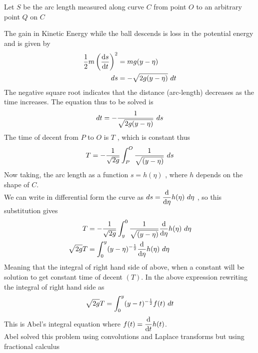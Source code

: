 Let $S$ be the arc length measured along curve $C$ from point $O$ to an arbitrary point $Q$ on $C$
\begin{center}
\end{center}
The gain in Kinetic Energy while the ball descends is loss in the
potential energy and is given by
\begin{align*}
    \frac{1}{2}m \left(\dv{s}{t}\right)^2 &= mg(y-\eta)
    \\
    ds &= - \sqrt{2g (y-\eta)} \,\, dt
\end{align*}
The negative square root indicates that the distance (arc-length) decreases as the
time increases.
The equation thus to be solved is
\[
    dt = -\frac{1}{\sqrt{2g (y-\eta)}} \,\, ds
\]
The time of decent from $P$ to $O$ is $T$ , which is constant thus
\[
    T = -\frac{1}{\sqrt{2g}} \int_{P}^{O}\frac{1}{\sqrt{(y-\eta)}} \,\, ds
\]
Now taking, the arc length as a function $s = h(\eta)$ , where $h$ depends on the shape
of $C$. \\
We can write in differential form the curve as $\displaystyle ds = \dv{}{\eta}h(\eta) \,\, d\eta $ , so this substitution gives
\begin{align*}
    T &= -\frac{1}{\sqrt{2g}} \int_{y}^{0}\frac{1}{\sqrt{(y-\eta)}} \dv{}{\eta}h(\eta) \,\, d\eta
    \\
    \sqrt{2g} T &= \int_{0}^{y}(y-\eta)^{-\frac{1}{2}} \dv{}{\eta}h(\eta) \,\, d\eta
\end{align*}
Meaning that the integral of right hand side of above, when a constant will be solution to get
constant time of decent $(T)$. In the above expression rewriting the integral of right hand side as
\[
    \sqrt{2g} T = \int_{0}^{y}(y-t)^{-\frac{1}{2}} f(t) \,\, dt
\]
This is Abel's integral equation where $\displaystyle f(t) = \dv{}{t}h(t)$.
\\
Abel solved this problem using convolutions and Laplace transforms but using fractional calculus 
